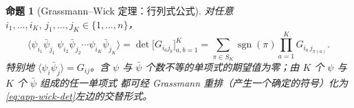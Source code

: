 \documentclass[UTF8,a4paper,11pt,fontset=fandol]{ctexart}
\theoremstyle{cplain}
\newtheorem{proposition}[theorem]{命题}
\theoremstyle{cdefinition}
\theoremstyle{cremark}
\numberwithin{equation}{section}
\begin{document}
\begin{proposition}[Grassmann--Wick 定理：行列式公式]\label{prop:app-wick-det}
对任意 $i_1,\dots,i_K,\,j_1,\dots,j_K\in\{1,\dots,n\}$，
\begin{equation}\label{eq:app-wick-det}
\bigl\langle\psi_{i_1}\bar\psi_{j_1}\,\psi_{i_2}\bar\psi_{j_2}\cdots\psi_{i_K}\bar\psi_{j_K}\bigr\rangle
=\det\bigl[G_{i_aj_b}\bigr]_{a,b=1}^{K}=\sum_{\pi\in S_K}\operatorname{sgn}(\pi)\prod_{a=1}^{K}G_{i_a\,j_{\pi(a)}} .
\end{equation}
特别地 $\langle\psi_i\bar\psi_j\rangle=G_{ij}$。含 $\psi$ 与 $\bar\psi$ 个数不等的单项式的期望值为零；由 $K$ 个 $\psi$ 与 $K$ 个 $\bar\psi$ 组成的任一单项式
都可经 Grassmann 重排（产生一个确定的符号）化为\cref{eq:app-wick-det}左边的交替形式。
\end{proposition}
\end{document}
